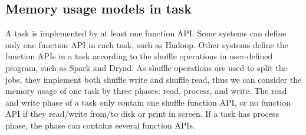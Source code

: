 


\subsection{Memory usage models in task}
\label{subsec:taskmodel}

A task is implemented by at least one function API. Some systems can define only one function API in each task, such as Hadoop. Other systems define the function APIs in a task according to the shuffle operations in user-defined program, such as Spark and Dryad. As shuffle operations are used to split the jobs, they implement both shuffle write and shuffle read, thus we can consider the memory usage of one task by three phases: read, process, and write. The read and write phase of a task only contain one shuffle function API, or no function API if they read/write from/to disk or print in screen. If a task has process phase, the phase can contains several function APIs. 

